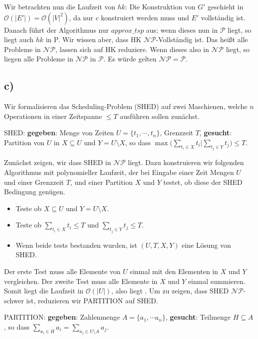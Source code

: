 \documentclass[a4paper,11pt]{article}
\begin{document}
Wir betrachten nun die Laufzeit von $hk$: Die Konstruktion von $G'$ geschieht in $\mathcal{O}(|E'|)=\mathcal{O}(|V|^2)$, da nur $c$ konstruiert werden muss und $E'$ vollständig ist. Danach führt der Algorithmus nur $approx\_tsp$ aus; wenn dieses nun in $\mathcal{P}$ liegt, so liegt auch $hk$ in P. Wir wissen aber, dass HK $\mathcal{NP}$-Vollständig ist. Das heißt alle Probleme in $\mathcal{NP}$, lassen sich auf HK reduziere. Wenn dieses also in $\mathcal{NP}$ liegt, so liegen alle Probleme in $\mathcal{NP}$ in $\mathcal{P}$. Es würde gelten $\mathcal{NP}=\mathcal{P}$.

\subsection*{c)}
Wir formalisieren das Scheduling-Problem (SHED) auf zwei Maschienen, welche $n$ Operationen in einer Zeitspanne $\leq T$ ausführen sollen zunächst.

SHED: \textbf{gegeben}: Menge von Zeiten $U=\{t_1,\cdots,t_n\}$, Grenzzeit $T$, \textbf{gesucht}: Partition von $U$ in $X\subseteq U$ und $Y = U\setminus X$, so dass $\max\big(\sum_{t_i\in X}t_i\big|\sum_{t_j\in Y}t_j\big)\leq T$. 

Zunächst zeigen, wir dass SHED in $\mathcal{NP}$ liegt. Dazu konstruieren wir folgenden Algorithmus mit polynomieller Laufzeit, der bei Eingabe einer Zeit Mengen $U$ und einer Grenzzeit $T$, und einer Partition $X$ und $Y$ testet, ob diese der SHED Bedingung genügen. 

\begin{itemize}
\item Teste ob $X\subseteq U$ und $Y = U\setminus X$.
\item Teste ob $\sum_{t_i\in X}t_i\leq T$ und $\sum_{t_j\in Y}t_j\leq T$.
\item Wenn beide tests bestanden wurden, ist $(U,T,X,Y)$ eine Lösung von SHED.
\end{itemize}

Der erste Test muss alle Elemente von $U$ einmal mit den Elementen in $X$ und $Y$ vergleichen. Der zweite Test muss alle Elemente in $X$ und $Y$ einmal summieren. Somit liegt die Laufzeit in $\mathcal{O}(|U|)$, also liegt . Um zu zeigen, dass SHED $\mathcal{NP}$-schwer ist, reduzieren wir PARTITION auf SHED. 

PARTITION: \textbf{gegeben}: Zahlenmenge $A=\{a_1,\cdots a_n\}$, \textbf{gesucht}: Teilmenge $H\subseteq A$, so dass $\sum_{a_i\in H}a_i=\sum_{a_j\in U\setminus A}a_j$.
\end{document}
